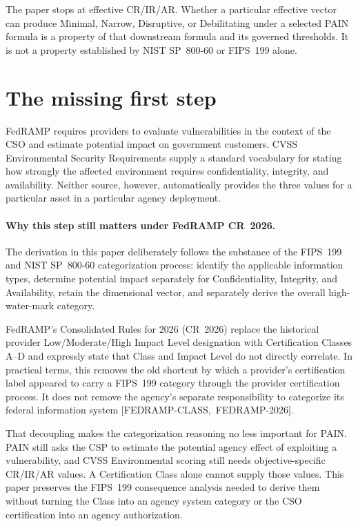 \documentclass[11pt]{article}
\begin{document}
\begin{boundarybox}
The paper stops at effective CR/IR/AR. Whether a particular effective vector can
produce Minimal, Narrow, Disruptive, or Debilitating under a selected PAIN formula
is a property of that downstream formula and its governed thresholds. It is not a
property established by NIST SP~800-60 or FIPS~199 alone.
\end{boundarybox}

\section{The missing first step}

FedRAMP requires providers to evaluate vulnerabilities in the context of the CSO
and estimate potential impact on government customers. CVSS Environmental Security
Requirements supply a standard vocabulary for stating how strongly the affected
environment requires confidentiality, integrity, and availability. Neither source,
however, automatically provides the three values for a particular asset in a
particular agency deployment.

\paragraph{Why this step still matters under FedRAMP CR~2026.}
The derivation in this paper deliberately follows the substance of the FIPS~199 and
NIST SP~800-60 categorization process: identify the applicable information types,
determine potential impact separately for Confidentiality, Integrity, and
Availability, retain the dimensional vector, and separately derive the overall
high-water-mark category.

FedRAMP's Consolidated Rules for 2026 (CR~2026) replace the historical provider
Low/Moderate/High Impact Level designation with Certification Classes A--D and
expressly state that Class and Impact Level do not directly correlate. In practical
terms, this removes the old shortcut by which a provider's certification label
appeared to carry a FIPS~199 category through the provider certification process.
It does not remove the agency's separate responsibility to categorize its federal
information system \mbox{[FEDRAMP-CLASS, FEDRAMP-2026]}.

That decoupling makes the categorization reasoning no less important for PAIN.
PAIN still asks the CSP to estimate the potential agency effect of exploiting a
vulnerability, and CVSS Environmental scoring still needs objective-specific
CR/IR/AR values. A Certification Class alone cannot supply those values. This
paper preserves the FIPS~199 consequence analysis needed to derive them without
turning the Class into an agency system category or the CSO certification into an
agency authorization.
\end{document}
